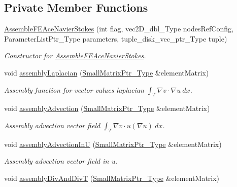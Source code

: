 \subsection*{Private Member Functions}
\begin{DoxyCompactItemize}
\item 
\hyperlink{classFEDD_1_1AssembleFEAceNavierStokes_a8ce04708bc97ffe80efbd687ce1c061a}{Assemble\+F\+E\+Ace\+Navier\+Stokes} (int flag, vec2\+D\+\_\+dbl\+\_\+\+Type nodes\+Ref\+Config, Parameter\+List\+Ptr\+\_\+\+Type parameters, tuple\+\_\+disk\+\_\+vec\+\_\+ptr\+\_\+\+Type tuple)
\begin{DoxyCompactList}\small\item\em Constructor for \hyperlink{classFEDD_1_1AssembleFEAceNavierStokes}{Assemble\+F\+E\+Ace\+Navier\+Stokes}. \end{DoxyCompactList}\item 
void \hyperlink{classFEDD_1_1AssembleFEAceNavierStokes_ad66c0a9db00956e8df47d50d2e682403}{assembly\+Laplacian} (\hyperlink{classFEDD_1_1AssembleFE_afb5fb5dca3aab59f697a25884e99e894}{Small\+Matrix\+Ptr\+\_\+\+Type} \&element\+Matrix)
\begin{DoxyCompactList}\small\item\em Assembly function for vector values laplacian $ \int_T \nabla v \cdot \nabla u ~dx$. \end{DoxyCompactList}\item 
void \hyperlink{classFEDD_1_1AssembleFEAceNavierStokes_a29d454fb17d4f9a878471fedb3317f2d}{assembly\+Advection} (\hyperlink{classFEDD_1_1AssembleFE_afb5fb5dca3aab59f697a25884e99e894}{Small\+Matrix\+Ptr\+\_\+\+Type} \&element\+Matrix)
\begin{DoxyCompactList}\small\item\em Assembly advection vector field $ \int_T \nabla v \cdot u(\nabla u) ~dx$. \end{DoxyCompactList}\item 
void \hyperlink{classFEDD_1_1AssembleFEAceNavierStokes_a43e917f0b7509f8e95b0136af7876405}{assembly\+Advection\+InU} (\hyperlink{classFEDD_1_1AssembleFE_afb5fb5dca3aab59f697a25884e99e894}{Small\+Matrix\+Ptr\+\_\+\+Type} \&element\+Matrix)
\begin{DoxyCompactList}\small\item\em Assembly advection vector field in u. \end{DoxyCompactList}\item 
void \hyperlink{classFEDD_1_1AssembleFEAceNavierStokes_afec8907a0c90e42b5d0ceeb2509f3b31}{assembly\+Div\+And\+DivT} (\hyperlink{classFEDD_1_1AssembleFE_afb5fb5dca3aab59f697a25884e99e894}{Small\+Matrix\+Ptr\+\_\+\+Type} \&element\+Matrix)

\end{DoxyCompactItemize}
